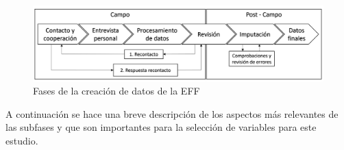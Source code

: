\begin{figure}[ht]
	\centering
	\includegraphics[width=1\textwidth]{figs/fases_creacion_datos_eff.png}
	\caption{Fases de la creación de datos de la EFF}
	\label{fig:eff_phases}
\end{figure}

A continuación se hace una breve descripción de los aspectos más relevantes de las subfases y que son importantes para la selección de variables para este estudio.

